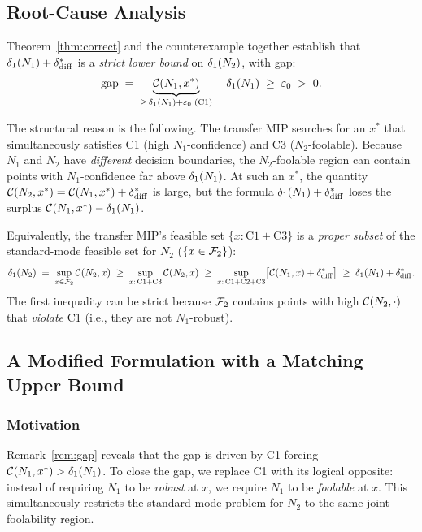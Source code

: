 \subsection{Root-Cause Analysis}
\label{sec:formal:analysis}

Theorem~\ref{thm:correct} and the counterexample together establish that $\delta_1(N_{1})+\delta_{\mathrm{diff}}^{*}$ is a \emph{strict lower bound} on $\delta_1(N_{2})$, with gap:
\[
  \mathrm{gap}
  \;=\;
  \underbrace{\mathcal{C}(N_1,x^*)}_{\geq\,\delta_1(N_{1})+\varepsilon_0\;(\mathrm{C1})}
  -\;
  \delta_1(N_{1})
  \;\geq\;\varepsilon_0\;>\;0.
\]

The structural reason is the following. The transfer MIP searches for an $x^*$ that simultaneously satisfies C1 (high $N_1$-confidence) and C3 ($N_2$-foolable). Because $N_1$ and $N_2$ have \emph{different} decision boundaries, the $N_2$-foolable region can contain points with $N_1$-confidence far above $\delta_1(N_{1})$. At such an $x^*$, the quantity $\mathcal{C}(N_2,x^*)=\mathcal{C}(N_1,x^*)+\delta_{\mathrm{diff}}^{*}$ is large, but the formula $\delta_1(N_{1})+\delta_{\mathrm{diff}}^{*}$ loses the surplus $\mathcal{C}(N_1,x^*)-\delta_1(N_{1})$.

Equivalently, the transfer MIP's feasible set $\{x:\mathrm{C1{+}C3}\}$ is a \emph{proper subset} of the standard-mode feasible set for $N_2$ ($\{x\in\mathcal{F}_{2}\}$):
\[
  \delta_1(N_{2})
  \;=\;
  \sup_{x\in\mathcal{F}_{2}}\mathcal{C}(N_2,x)
  \;\geq\;
  \sup_{x:\,\mathrm{C1{+}C3}}\mathcal{C}(N_2,x)
  \;\geq\;
  \sup_{x:\,\mathrm{C1{+}C2{+}C3}}\bigl[\mathcal{C}(N_1,x)+\delta_{\mathrm{diff}}^{*}\bigr]
  \;\geq\;
  \delta_1(N_{1})+\delta_{\mathrm{diff}}^{*}.
\]
The first inequality can be strict because $\mathcal{F}_{2}$ contains points with high $\mathcal{C}(N_2,\cdot)$ that \emph{violate} C1 (i.e., they are not $N_1$-robust).

\subsection{A Modified Formulation with a Matching Upper Bound}
\label{sec:formal:modified}

\subsubsection{Motivation}

Remark~\ref{rem:gap} reveals that the gap is driven by C1 forcing $\mathcal{C}(N_1,x^*)>\delta_1(N_{1})$. To close the gap, we replace C1 with its logical opposite: instead of requiring $N_1$ to be \emph{robust} at $x$, we require $N_1$ to be \emph{foolable} at $x$. This simultaneously restricts the standard-mode problem for $N_2$ to the same joint-foolability region.

